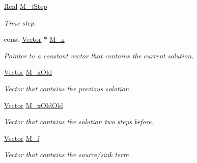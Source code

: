 \begin{DoxyCompactItemize}
\item 
\hyperlink{namespaceFVCode3D_a40c1f5588a248569d80aa5f867080e83}{Real} \hyperlink{classFVCode3D_1_1DarcyPseudoSteady_3_01QRMatrix_00_01QRFracture_00_01MatrixType_00_01BDF2_01_4_add13be3dd742cf61cb539b3503dbd536}{M\+\_\+t\+Step}
\begin{DoxyCompactList}\small\item\em Time step. \end{DoxyCompactList}\item 
const \hyperlink{namespaceFVCode3D_a16ccf345652402bccd1a5d2e6782526c}{Vector} $\ast$ \hyperlink{classFVCode3D_1_1DarcyPseudoSteady_3_01QRMatrix_00_01QRFracture_00_01MatrixType_00_01BDF2_01_4_a62b0ac4a6c48a2000d38747a68293331}{M\+\_\+x}
\begin{DoxyCompactList}\small\item\em Pointer to a constant vector that contains the current solution. \end{DoxyCompactList}\item 
\hyperlink{namespaceFVCode3D_a16ccf345652402bccd1a5d2e6782526c}{Vector} \hyperlink{classFVCode3D_1_1DarcyPseudoSteady_3_01QRMatrix_00_01QRFracture_00_01MatrixType_00_01BDF2_01_4_aa19786aa2e4287d36aeed82511fa4154}{M\+\_\+x\+Old}
\begin{DoxyCompactList}\small\item\em Vector that contains the previous solution. \end{DoxyCompactList}\item 
\hyperlink{namespaceFVCode3D_a16ccf345652402bccd1a5d2e6782526c}{Vector} \hyperlink{classFVCode3D_1_1DarcyPseudoSteady_3_01QRMatrix_00_01QRFracture_00_01MatrixType_00_01BDF2_01_4_a242abf6d14e7d98a6a3b8fe3daef2276}{M\+\_\+x\+Old\+Old}
\begin{DoxyCompactList}\small\item\em Vector that contains the solution two steps before. \end{DoxyCompactList}\item 
\hyperlink{namespaceFVCode3D_a16ccf345652402bccd1a5d2e6782526c}{Vector} \hyperlink{classFVCode3D_1_1DarcyPseudoSteady_3_01QRMatrix_00_01QRFracture_00_01MatrixType_00_01BDF2_01_4_a8a75d8bd731f7b15ec65ada8eca3d67e}{M\+\_\+f}
\begin{DoxyCompactList}\small\item\em Vector that contains the source/sink term. \end{DoxyCompactList}\item 

\end{DoxyCompactItemize}
